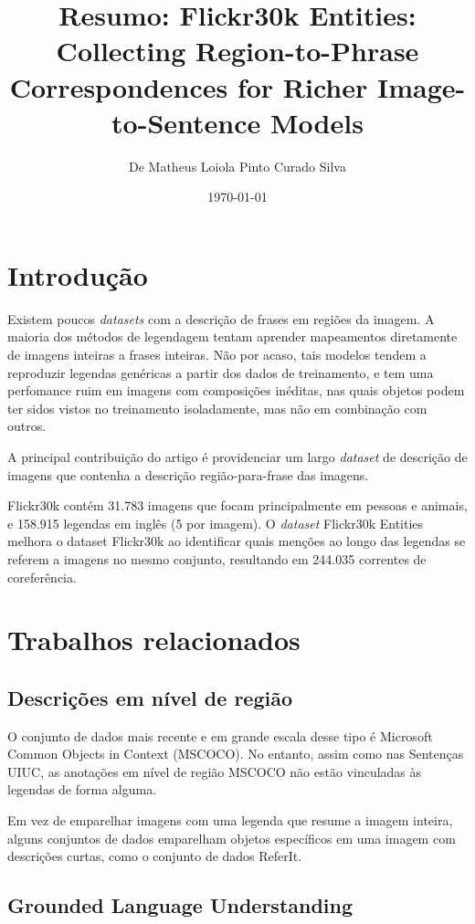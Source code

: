 \documentclass[12pt]{article}
\title{Resumo: Flickr30k Entities: Collecting Region-to-Phrase Correspondences for
Richer Image-to-Sentence Models}
\author{De Matheus Loiola Pinto Curado Silva}
\date{\today}
\begin{document}
	
\maketitle

\section*{Introdução}

Existem poucos \textit{datasets} com a descrição de frases em regiões da imagem. A maioria dos métodos de legendagem tentam aprender mapeamentos diretamente de imagens inteiras a frases inteiras. Não por acaso, tais modelos tendem a reproduzir legendas genéricas a partir dos dados de treinamento, e tem uma perfomance ruim em imagens com composições inéditas, nas quais objetos podem ter sidos vistos no treinamento isoladamente, mas não em combinação com outros.

A principal contribuição do artigo é providenciar um largo \textit{dataset} de descrição de imagens que contenha a descrição região-para-frase das imagens.

Flickr30k contém 31.783 imagens que focam principalmente em pessoas e animais, e 158.915 legendas em inglês (5 por imagem). O \textit{dataset} Flickr30k Entities melhora o dataset Flickr30k ao identificar quais menções ao longo das legendas se referem a imagens no mesmo conjunto, resultando em 244.035 correntes de coreferência.

\section*{Trabalhos relacionados}

\subsection*{Descrições em nível de região}

O conjunto de dados mais recente e em grande escala desse tipo é Microsoft Common Objects in Context (MSCOCO). No entanto, assim como nas Sentenças UIUC, as anotações em nível de região MSCOCO não estão vinculadas às legendas de forma alguma.

Em vez de emparelhar imagens com uma legenda que resume a imagem inteira, alguns conjuntos de dados emparelham objetos específicos em uma imagem com descrições curtas, como o conjunto de dados ReferIt.

\subsection*{Grounded Language Understanding}
\end{document}
